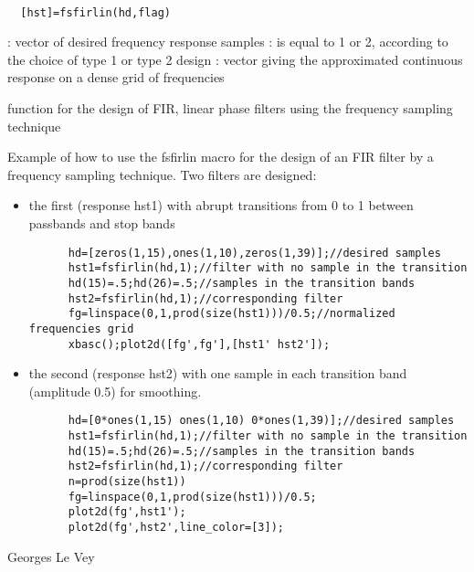 \begin{mandesc}
   \\ %
\end{mandesc}
\begin{calling_sequence}
\begin{verbatim}
  [hst]=fsfirlin(hd,flag)  
\end{verbatim}
\end{calling_sequence}
\begin{parameters}
  \begin{varlist}
    : vector of desired frequency response samples
    : is equal to 1 or 2, according to the choice of type 1 or type 2 design
    : vector giving the approximated continuous response on a dense grid of frequencies
  \end{varlist}
\end{parameters}
\begin{mandescription}
  function for the design of FIR, linear phase filters
  using the frequency sampling technique
\end{mandescription}
\begin{examples}
  Example of how to use the fsfirlin macro for the design 
  of an FIR filter by a frequency sampling technique.
  Two filters are designed: 
  \begin{itemize}
  \item the first (response hst1) with 
    abrupt transitions from 0 to 1 between passbands and stop 
    bands
    \begin{Verbatim}
      hd=[zeros(1,15),ones(1,10),zeros(1,39)];//desired samples
      hst1=fsfirlin(hd,1);//filter with no sample in the transition
      hd(15)=.5;hd(26)=.5;//samples in the transition bands
      hst2=fsfirlin(hd,1);//corresponding filter
      fg=linspace(0,1,prod(size(hst1)))/0.5;//normalized frequencies grid
      xbasc();plot2d([fg',fg'],[hst1' hst2']);
    \end{Verbatim}
  \item the second (response hst2) with one sample in each 
    transition band (amplitude 0.5) for smoothing.
    \begin{Verbatim}
      hd=[0*ones(1,15) ones(1,10) 0*ones(1,39)];//desired samples
      hst1=fsfirlin(hd,1);//filter with no sample in the transition
      hd(15)=.5;hd(26)=.5;//samples in the transition bands
      hst2=fsfirlin(hd,1);//corresponding filter
      n=prod(size(hst1))
      fg=linspace(0,1,prod(size(hst1)))/0.5;
      plot2d(fg',hst1');
      plot2d(fg',hst2',line_color=[3]);
    \end{Verbatim}
  \end{itemize}
\end{examples}
\begin{manseealso}
     
\end{manseealso}
\begin{authors}
  Georges Le Vey
\end{authors}
